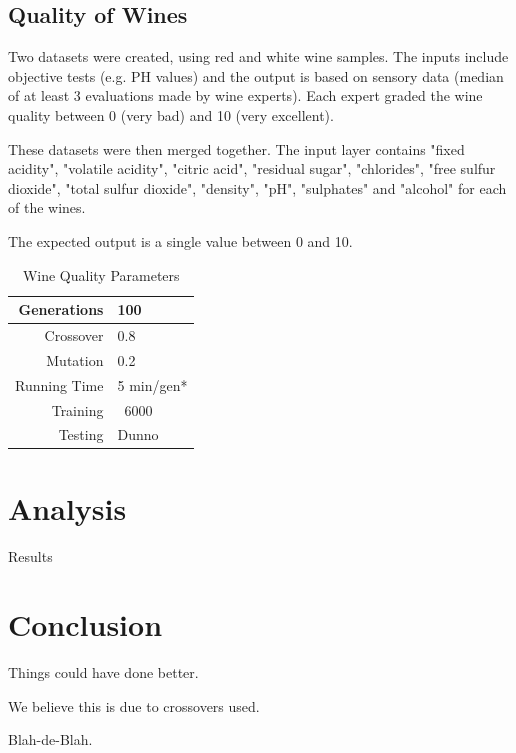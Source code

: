 \documentclass[journal]{IEEEtran}
\begin{document}
  \subsection{Quality of Wines}
  Two datasets were created, using red and white wine samples.
  The inputs include objective tests (e.g. PH values) and the output is based on sensory data
  (median of at least 3 evaluations made by wine experts). Each expert graded the wine quality 
  between 0 (very bad) and 10 (very excellent). %
  
  These datasets were then merged together. The input layer contains 
  "fixed acidity", "volatile acidity", "citric acid", "residual sugar", "chlorides", 
  "free sulfur dioxide", "total sulfur dioxide", "density", "pH", "sulphates" and "alcohol"
  for each of the wines.
  
  The expected output is a single value between 0 and 10.
  
  \begin{table}[here]
    \renewcommand{\arraystretch}{1.3}
    \caption{Wine Quality Parameters}
    \label{E2}
    \centering
    \begin{tabular}{r||l}
      \hline
      Generations & 100  \\ \hline
      Crossover   & 0.8 \\ \hline
      Mutation    & 0.2 \\ \hline
      Running Time & 5 min/gen* \\ \hline
      Training    & ~6000 \\ \hline
      Testing     & Dunno \\ \hline
    \end{tabular}
   \end{table}
  
\section{Analysis}
Results

\section{Conclusion}
Things could have done better.

We believe this is due to crossovers used.

Blah-de-Blah.


\end{document}
